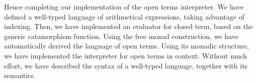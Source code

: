 Hence completing our implementation of the open terms interpreter.
We have defined a well-typed language of arithmetical expressions,
taking advantage of indexing. Then, we have implemented an evaluator
for closed term, based on the generic catamorphism function. Using the
free monad construction, we have automatically derived the language of
open terms. Using its monadic structure, we have implemented the
interpreter for open terms in context. Without much effort, we
have described the syntax of a well-typed language, together with its
semantics.
